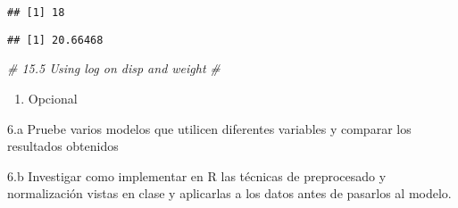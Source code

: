 \documentclass[]{article}
\newenvironment{Shaded}{\begin{snugshade}}{\end{snugshade}}
\newcommand{\CommentTok}[1]{\textcolor[rgb]{0.56,0.35,0.01}{\textit{#1}}}
\newcommand{\DataTypeTok}[1]{\textcolor[rgb]{0.13,0.29,0.53}{#1}}
\newcommand{\KeywordTok}[1]{\textcolor[rgb]{0.13,0.29,0.53}{\textbf{#1}}}
\newcommand{\NormalTok}[1]{#1}
\newcommand{\OperatorTok}[1]{\textcolor[rgb]{0.81,0.36,0.00}{\textbf{#1}}}
\providecommand{\tightlist}{%
  \setlength{\itemsep}{0pt}\setlength{\parskip}{0pt}}
\begin{document}
\begin{verbatim}
## [1] 18
\end{verbatim}

\begin{Shaded}
\end{Shaded}

\begin{verbatim}
## [1] 20.66468
\end{verbatim}

\begin{Shaded}
\begin{Highlighting}[]
\CommentTok{# 15.5 Using log on disp and weight}
\CommentTok{# }
\end{Highlighting}
\end{Shaded}

\begin{enumerate}
\def\labelenumi{\arabic{enumi}.}
\setcounter{enumi}{5}
\tightlist
\item
  Opcional
\end{enumerate}

6.a Pruebe varios modelos que utilicen diferentes variables y comparar
los resultados obtenidos

6.b Investigar como implementar en R las técnicas de preprocesado y
normalización vistas en clase y aplicarlas a los datos antes de pasarlos
al modelo.
\end{document}
